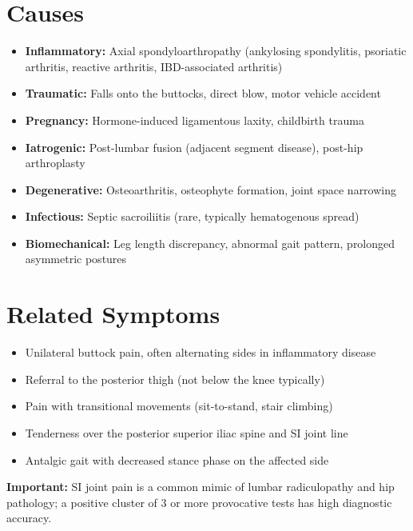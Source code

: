 \section*{Causes}
\begin{itemize}
  \item \textbf{Inflammatory:} Axial spondyloarthropathy (ankylosing spondylitis, psoriatic arthritis, reactive arthritis, IBD-associated arthritis)
  \item \textbf{Traumatic:} Falls onto the buttocks, direct blow, motor vehicle accident
  \item \textbf{Pregnancy:} Hormone-induced ligamentous laxity, childbirth trauma
  \item \textbf{Iatrogenic:} Post-lumbar fusion (adjacent segment disease), post-hip arthroplasty
  \item \textbf{Degenerative:} Osteoarthritis, osteophyte formation, joint space narrowing
  \item \textbf{Infectious:} Septic sacroiliitis (rare, typically hematogenous spread)
  \item \textbf{Biomechanical:} Leg length discrepancy, abnormal gait pattern, prolonged asymmetric postures
\end{itemize}

\section*{Related Symptoms}
\begin{itemize}
  \item Unilateral buttock pain, often alternating sides in inflammatory disease
  \item Referral to the posterior thigh (not below the knee typically)
  \item Pain with transitional movements (sit-to-stand, stair climbing)
  \item Tenderness over the posterior superior iliac spine and SI joint line
  \item Antalgic gait with decreased stance phase on the affected side
\end{itemize}
\textbf{Important:} SI joint pain is a common mimic of lumbar radiculopathy and hip pathology; a positive cluster of 3 or more provocative tests has high diagnostic accuracy.

